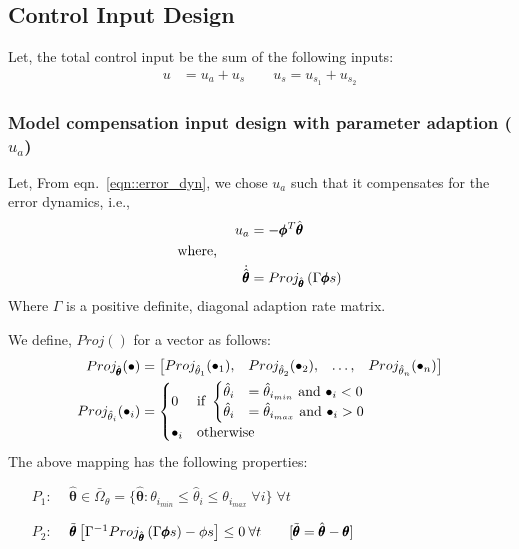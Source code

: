\subsection{Control Input Design}
Let, the total control input be the sum of the following inputs:
\begin{align*}
    u &= u_a + u_s \qquad u_s = u_{s_1} + u_{s_2}
\end{align*}
\subsubsection{Model compensation input design with parameter adaption ($u_a$)}
Let, From eqn.~\ref{eqn::error_dyn}, we chose $u_a$ such that it compensates for
the error dynamics, i.e.,
\begin{align*}
    u_a &= - \pmb \phi^T  \hat{\pmb{\theta}} \\
    \text{where, } \qquad &\\
    \dot{\hat{\pmb{\theta}}} &= Proj_{\hat{\pmb{\theta}}}\left( \Gamma \pmb \phi s \right)\\
\end{align*}
Where $\Gamma$ is a positive definite, diagonal adaption rate matrix.

We define,  $Proj()$ for a vector as follows:
\begin{align*}
    Proj_{\hat{\pmb\theta}} (\bullet) &= \begin{bmatrix} Proj_{\hat \theta_1}(\bullet_1), &
                                        Proj_{\hat \theta_2}(\bullet_2), &
                                        \hdots, &
                                        Proj_{\hat \theta_n}(\bullet_n) \end{bmatrix}\\
    Proj_{\hat \theta_i}(\bullet_i) &= \begin{cases}
        0 & \text{if } \begin{cases}
                        \hat \theta_i &= \hat \theta_{i_{min}} \text{  and  } \bullet_i < 0\\
                        \hat \theta_i &= \hat \theta_{i_{max}} \text{  and  } \bullet_i > 0\\
                       \end{cases}\\
        \bullet_i & \text{otherwise}
    \end{cases}
\end{align*}
The above mapping has the following properties:
\begin{itemize}
    \item[$P_1$:] $\quad \hat{\pmb \theta} \in \bar \Omega_{\theta}=\{\hat{\pmb \theta} : \theta_{i_{min}} \leq \hat \theta_i \leq \theta_{i_{max}} \; \forall i\} \; \forall t$

    \item[$P_2$:] $\quad \tilde{\pmb{\theta}} \left[ \Gamma^{-1}
    Proj_{\hat{\pmb\theta}} \left( \Gamma \pmb \phi s \right) - \phi s \right] \leq 0 \:
    \forall t \qquad [\tilde{\pmb{\theta}} = \hat{\pmb\theta} - \pmb \theta]$
\end{itemize}


